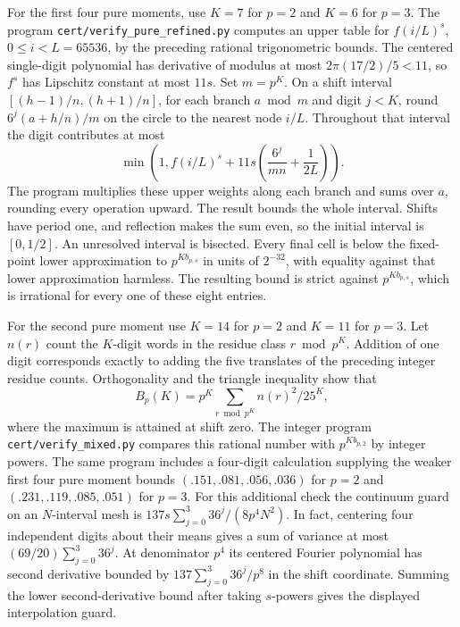 \documentclass[11pt,a4paper]{article}
\theoremstyle{paperplain}
\numberwithin{equation}{section}
\begin{document}
For the first four pure moments, use $K=7$ for $p=2$ and $K=6$ for
$p=3$. The program \texttt{cert/verify\_pure\_refined.py} computes an
upper table for $f(i/L)^s$, $0\le i<L=65536$, by the preceding
rational trigonometric bounds. The centered single-digit polynomial
has derivative of modulus at most $2\pi(17/2)/5<11$, so $f^s$ has
Lipschitz constant at most $11s$. Set $m=p^K$. On a shift interval
$[(h-1)/n,(h+1)/n]$, for each branch $a\bmod m$ and digit $j<K$,
round $6^j(a+h/n)/m$ on the circle to the nearest node $i/L$.
Throughout that interval the digit contributes at most
\[
 \min\left(1,f(i/L)^s+11s\left(\frac{6^j}{mn}+\frac1{2L}\right)\right).
\]
The program multiplies these upper weights along each branch and sums
over $a$, rounding every operation upward. The result bounds the
whole interval. Shifts have period one, and reflection makes the sum
even, so the initial interval is $[0,1/2]$. An unresolved interval
is bisected. Every final cell is below the fixed-point lower
approximation to $p^{K b_{p,s}}$ in units of $2^{-32}$, with equality
against that lower approximation harmless. The resulting bound is
strict against $p^{K b_{p,s}}$, which is irrational for every one of
these eight entries.

For the second pure moment use $K=14$ for $p=2$ and $K=11$ for
$p=3$. Let $n(r)$ count the $K$-digit words in the residue class
$r\bmod p^K$. Addition of one digit corresponds exactly to adding
the five translates of the preceding integer residue counts.
Orthogonality and the triangle inequality show that
\[
 B_p(K)=p^K\sum_{r\bmod p^K} n(r)^2/25^K,
\]
where the maximum is attained at shift zero. The integer program
\texttt{cert/verify\_mixed.py} compares this rational number with
$p^{K b_{p,2}}$ by integer powers. The same program includes a
four-digit calculation supplying the weaker first four pure moment
bounds $(.151,.081,.056,.036)$ for $p=2$ and
$(.231,.119,.085,.051)$ for $p=3$. For this additional check the
continuum guard on an $N$-interval mesh is
$137s\sum_{j=0}^3 36^j/(8p^4 N^2)$. In fact, centering four
independent digits about their means gives a sum of variance at
most $(69/20)\sum_{j=0}^3 36^j$. At denominator $p^4$ its centered
Fourier polynomial has second derivative bounded by
$137\sum_{j=0}^3 36^j/p^8$ in the shift coordinate.
Summing the lower second-derivative bound after taking $s$-powers
gives the displayed interpolation guard.
\end{document}
